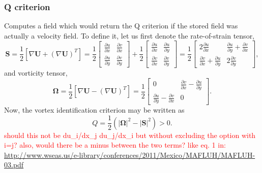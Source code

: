 \documentclass[notitlepage]{article}
\begin{document}
\subsubsection{Q criterion}

Computes a field which would return the Q criterion if the stored
field was actually a velocity field.
To define it, let us first denote the rate-of-strain tensor,
%
\begin{equation}
\mathbf{S} = \frac{1}{2}\left[\nabla\mathbf{U}+\left(\nabla\mathbf{U}\right)^T\right]
	= \frac{1}{2} \begin{bmatrix}
		\frac{\partial u}{\partial x} & \frac{\partial v}{\partial x} \\
		\frac{\partial u}{\partial y} & \frac{\partial v}{\partial y}
		\end{bmatrix}
	+ \frac{1}{2} \begin{bmatrix}
		\frac{\partial u}{\partial x} & \frac{\partial u}{\partial y} \\
		\frac{\partial v}{\partial x} & \frac{\partial v}{\partial y}
		\end{bmatrix}
	= \frac{1}{2} \begin{bmatrix}
		2\frac{\partial u}{\partial x} & \frac{\partial u}{\partial y} + \frac{\partial v}{\partial x} \\
		\frac{\partial v}{\partial x} + \frac{\partial u}{\partial y} & 2\frac{\partial v}{\partial y}
		\end{bmatrix} ,
\end{equation}
%
and vorticity tensor,
%
\begin{equation}
\mathbf{\Omega} = \frac{1}{2}\left[\nabla\mathbf{U}-\left(\nabla\mathbf{U}\right)^T\right]
	= \frac{1}{2} \begin{bmatrix}
		0 & \frac{\partial v}{\partial x} - \frac{\partial u}{\partial y} \\
		\frac{\partial u}{\partial y} - \frac{\partial v}{\partial x} & 0
		\end{bmatrix} .
\end{equation}
%
Now, the vortex identification criterion may be written as
%
\begin{equation}
Q = \frac{1}{2} \left(\left|\mathbf{\Omega}\right|^2
	- \left|\mathbf{S}\right|^2 \right) > 0.
\end{equation}
\textcolor{red}{should this not be du\_i/dx\_j du\_j/dx\_i but without
excluding the option with i=j? also, would there be a minus between the
two terms? like eq. 1 in:}
\url{http://www.wseas.us/e-library/conferences/2011/Mexico/MAFLUH/MAFLUH-03.pdf}
\end{document}
